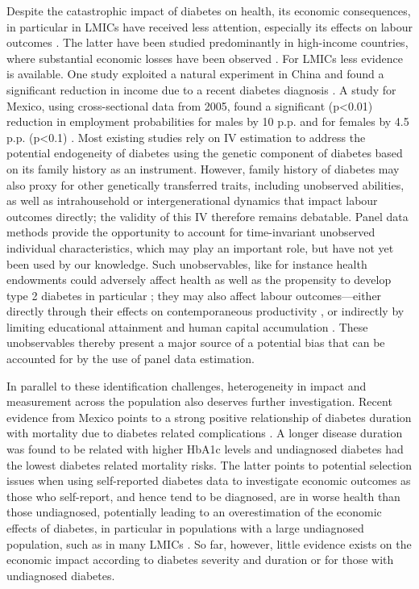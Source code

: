\documentclass[12pt,english]{article}
\begin{document}
Despite the catastrophic impact of diabetes on health, its economic consequences, in particular in \acp{LMIC} have received less attention, especially its effects on labour outcomes \parencite{Anonymous2007}. The latter have been studied predominantly in high-income countries, where substantial economic losses have been observed \parencite{Brown2005,Brown2014,BrownIII2011,Minor2011,Minor2013,Minor2015,Latif2009}. For \acp{LMIC} less evidence is available. One study exploited a natural experiment in China and found a significant reduction in income due to a recent diabetes diagnosis \parencite{Liu2014}. A study for Mexico, using cross-sectional data from 2005, found a significant (p<0.01) reduction in employment probabilities for males by 10 \ac{p.p.} and for females by 4.5 \ac{p.p.} (p<0.1) \parencite{Anonymous2007}. Most existing studies rely on \ac{IV} estimation to address the potential endogeneity of diabetes using the genetic component of diabetes based on its family history as an instrument.  However, family history of diabetes may also proxy for other genetically transferred traits, including unobserved abilities, as well as  intrahousehold or intergenerational dynamics that impact labour outcomes directly; the validity of this \ac{IV} therefore remains debatable. Panel data methods provide the opportunity to account for time-invariant unobserved individual characteristics, which may play an important role, but have not yet been used by our knowledge. Such unobservables, like for instance health endowments could adversely affect health as well as the propensity to develop type 2 diabetes in particular \parencite{VanEwijk2011,Sotomayor2013,Li2010b}; they may also affect labour outcomes---either directly through their effects on contemporaneous productivity \parencite{Currie2013}, or indirectly by limiting educational attainment and human capital accumulation \parencite{Ayyagari2011a}. These unobservables thereby present a major source of a potential bias that can be accounted for by the use of panel data estimation.

In parallel to these identification challenges, heterogeneity in impact and measurement across the population also deserves further investigation. Recent evidence from Mexico points to a strong positive relationship of diabetes duration with mortality due to diabetes related complications \parencite{Herrington2018}. A longer disease duration was found to be related with higher \ac{HbA1c} levels and undiagnosed diabetes had the lowest diabetes related mortality risks. The latter points to potential selection issues when using self-reported diabetes data to investigate economic outcomes as those who self-report, and hence tend to be diagnosed, are in worse health than those undiagnosed, potentially leading to an overestimation of the economic effects of diabetes, in particular in populations with a large undiagnosed population, such as in many \acp{LMIC} \parencite{Beagley2014}. So far, however, little evidence exists on the economic impact according to diabetes severity and duration or for those with undiagnosed diabetes. 
\end{document}
